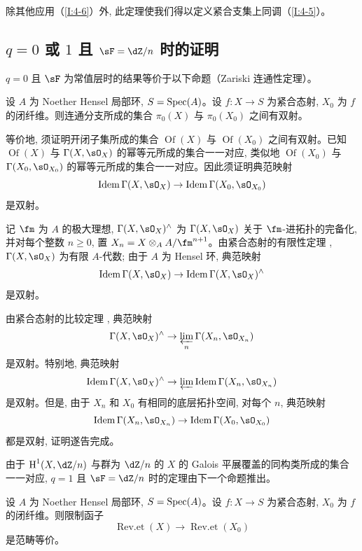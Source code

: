 除其他应用（\ref{I:4-6}）外, 此定理使我们得以定义紧合支集上同调（\ref{I:4-5}）。

\subsection{\texorpdfstring{$q=0$}{q=0} 或 \texorpdfstring{$1$}{1} 且 \texorpdfstring{$\sF=\dZ/n$}{\sF=Z/n} 时的证明}\label{I:4-2}

$q=0$ 且 $\sF$ 为常值层时的结果等价于以下命题（Zariski 连通性定理）。

\begin{proposition}\label{I:4-2-1}
设 $A$ 为 Noether Hensel 局部环, $S=\operatorname{Spec}(A)$。设 $f:X\to S$ 为紧合态射, $X_0$ 为 $f$ 的闭纤维。则连通分支所成的集合 $\pi_0(X)$ 与 $\pi_0(X_0)$ 之间有双射。
\end{proposition}

等价地, 须证明开闭子集所成的集合 $\operatorname{Of}(X)$ 与 $\operatorname{Of}(X_0)$ 之间有双射。已知 $\operatorname{Of}(X)$ 与 $\Gamma(X,\sO_X)$ 的幂等元所成的集合一一对应, 类似地 $\operatorname{Of}(X_0)$ 与 $\Gamma(X_0,\sO_{X_0})$ 的幂等元所成的集合一一对应。因此须证明典范映射
\[
  \operatorname{Idem} \Gamma(X,\sO_X) \to \operatorname{Idem}\Gamma(X_0,\sO_{X_0})
\]
是双射。

记 $\fm$ 为 $A$ 的极大理想, $\Gamma(X,\sO_X)^\wedge$ 为 $\Gamma(X,\sO_X)$ 关于 $\fm$-进拓扑的完备化, 并对每个整数 $n\geqslant0$, 置 $X_n=X\otimes_AA/\fm^{n+1}$。由紧合态射的有限性定理 \cite[III.3.2]{ega}, $\Gamma(X,\sO_X)$ 为有限 $A$-代数; 由于 $A$ 为 Hensel 环, 典范映射
\[
  \operatorname{Idem} \Gamma(X,\sO_X) \to \operatorname{Idem}\Gamma(X,\sO_X)^\wedge
\]
是双射。

由紧合态射的比较定理 \cite[III.4.1]{ega}, 典范映射
\[
  \Gamma(X,\sO_X)^\wedge \to \varprojlim_n\Gamma(X_n,\sO_{X_n})
\]
是双射。特别地, 典范映射
\[
  \operatorname{Idem} \Gamma(X,\sO_X)^\wedge \to \varprojlim \operatorname{Idem}\Gamma(X_n,\sO_{X_n})
\]
是双射。但是, 由于 $X_n$ 和 $X_0$ 有相同的底层拓扑空间, 对每个 $n$, 典范映射
\[
  \operatorname{Idem}\Gamma(X_n,\sO_{X_n}) \to \operatorname{Idem} \Gamma(X_0,\sO_{X_0})
\]
都是双射, 证明遂告完成。

由于 $\h^1(X,\dZ/n)$ 与群为 $\dZ/n$ 的 $X$ 的 Galois 平展覆盖的同构类所成的集合一一对应, $q=1$ 且 $\sF=\dZ/n$ 时的定理由下一个命题推出。

\begin{proposition}\label{I:4-2-2}
设 $A$ 为 Noether Hensel 局部环, $S=\operatorname{Spec}(A)$。设 $f:X\to S$ 为紧合态射, $X_0$ 为 $f$ 的闭纤维。则限制函子
\[
  \operatorname{Rev.et}(X) \to \operatorname{Rev.et}(X_0)
\]
是范畴等价。
\end{proposition}

